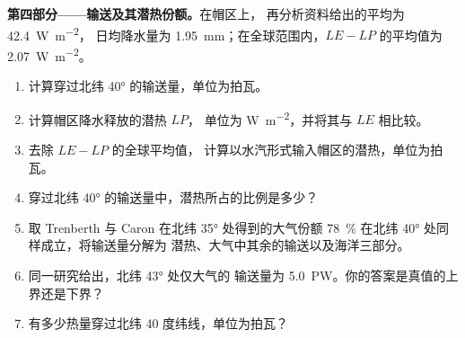 \begin{problem}
\medskip
\noindent\textbf{第四部分——输送及其潜热份额。}在帽区上，
再分析资料给出的平均为 \qty{42.4}{W.m^{-2}}，
日均降水量为 \qty{1.95}{mm}；在全球范围内，$LE - LP$ 的平均值为
\qty{2.07}{W.m^{-2}}。
\begin{enumerate}[resume]
  \item 计算穿过北纬 \ang{40} 的输送量，单位为拍瓦。
  \item 计算帽区降水释放的潜热 $LP$，
        单位为 \unit{W.m^{-2}}，并将其与 $LE$ 相比较。
  \item 去除 $LE - LP$ 的全球平均值，
        计算以水汽形式输入帽区的潜热，单位为拍瓦。
  \item 穿过北纬 \ang{40} 的输送量中，潜热所占的比例是多少？
  \item 取 Trenberth 与 Caron 在北纬 \ang{35} 处得到的大气份额
        \qty{78}{\percent} 在北纬 \ang{40} 处同样成立，将输送量分解为
        潜热、大气中其余的输送以及海洋三部分。
  \item 同一研究给出，北纬 \ang{43} 处仅大气的
        输送量为 \qty{5.0}{PW}。你的答案是真值的上界还是下界？
  \item 有多少热量穿过北纬 40 度纬线，单位为拍瓦？
\end{enumerate}
\end{problem}
